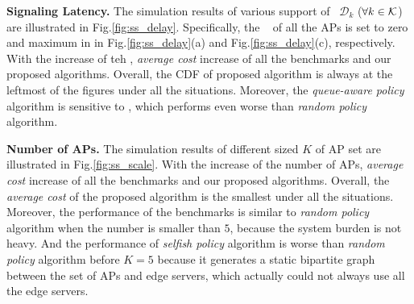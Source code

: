 
\textbf{Signaling Latency.}
The simulation results of various support of \brlatency~$\mathcal{D}_{k}$ ($\forall k\in\mathcal{K}$) are illustrated in Fig.\ref{fig:ss_delay}.
Specifically, the \brlatency~ of all the APs is set to zero and maximum in in Fig.\ref{fig:ss_delay}(a) and Fig.\ref{fig:ss_delay}(c), respectively.
With the increase of teh \brlatency, \emph{average cost} increase of all the benchmarks and our proposed algorithms.
Overall, the CDF of proposed algorithm is always at the leftmost of the figures under all the situations.
Moreover, the \emph{queue-aware policy} algorithm is sensitive to \brlatency, which performs even  worse than \emph{random policy} algorithm.

\textbf{Number of APs.} %
The simulation results of different sized $K$ of AP set are illustrated in Fig.\ref{fig:ss_scale}.
With the increase of the number of APs, \emph{average cost} increase of all the benchmarks and our proposed algorithms.
Overall, the \emph{average cost} of the proposed algorithm is the smallest under all the situations.
Moreover, the performance of the benchmarks is similar to \emph{random policy} algorithm when the number is smaller than $5$, because the system burden is not heavy.
And the performance of \emph{selfish policy} algorithm is worse than \emph{random policy} algorithm before $K=5$ because it generates a static bipartite graph between the set of APs and edge servers, which actually could not always use all the edge servers.


